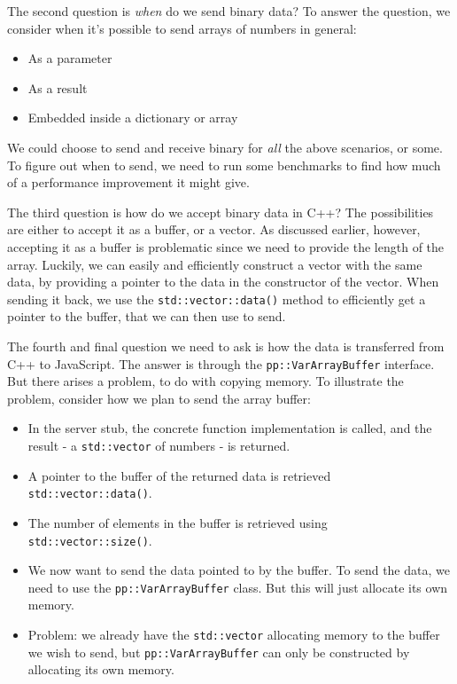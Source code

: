 The second question is \emph{when} do we send binary data? To answer the question, we consider when it's possible to send arrays of numbers in general:

\begin{itemize}
	\item As a parameter
	\item As a result
	\item Embedded inside a dictionary or array
\end{itemize}

We could choose to send and receive binary for \emph{all} the above scenarios, or some. To figure out when to send, we need to run some benchmarks to find how much of a performance improvement it might give.

The third question is how do we accept binary data in C++? The possibilities are either to accept it as a buffer, or a vector. As discussed earlier, however, accepting it as a buffer is problematic since we need to provide the length of the array. Luckily, we can easily and efficiently construct a vector with the same data, by providing a pointer to the data in the constructor of the vector. When sending it back, we use the \lstinline{std::vector::data()} method to efficiently get a pointer to the buffer, that we can then use to send.

The fourth and final question we need to ask is how the data is transferred from C++ to JavaScript. The answer is through the \lstinline{pp::VarArrayBuffer} interface. But there arises a problem, to do with copying memory. To illustrate the problem, consider how we plan to send the array buffer:

\begin{itemize}
	\item In the server stub, the concrete function implementation is called, and the result - a \lstinline{std::vector} of numbers - is returned.
	\item A pointer to the buffer of the returned data is retrieved \lstinline{std::vector::data()}.
	\item The number of elements in the buffer is retrieved using \lstinline{std::vector::size()}.
	\item We now want to send the data pointed to by the buffer. To send the data, we need to use the \lstinline{pp::VarArrayBuffer} class. But this will just allocate its own memory.
	\item Problem: we already have the \lstinline{std::vector} allocating memory to the buffer we wish to send, but \lstinline{pp::VarArrayBuffer} can only be constructed by allocating its own memory.
\end{itemize}

